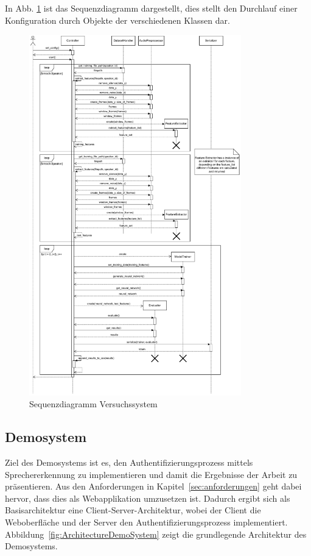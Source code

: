 In Abb. \ref{fig:sequenzdiagramm-versuchssystem} ist das Sequenzdiagramm dargestellt, dies stellt den Durchlauf einer Konfiguration durch Objekte der verschiedenen Klassen dar.
\begin{figure}[H]
    \centering
    \includegraphics[width=0.82\textwidth, keepaspectratio]{images/versuchssytem_sequenzdiagramm.pdf}
    \caption{Sequenzdiagramm Versuchssystem}
    \label{fig:sequenzdiagramm-versuchssystem}
\end{figure}\noindent


\textauthor{\vJB,}{\vLB}{}

\subsection{Demosystem}
Ziel des Demosystems ist es, den Authentifizierungsprozess mittels Sprechererkennung zu implementieren und damit die Ergebnisse der Arbeit zu präsentieren.
Aus den Anforderungen in Kapitel~\ref{sec:anforderungen} geht dabei hervor, dass dies als Webapplikation umzusetzen ist.
Dadurch ergibt sich als Basisarchitektur eine Client-Server-Architektur, wobei der Client die Weboberfläche und der Server den Authentifizierungsprozess implementiert.
Abbildung~\ref{fig:ArchitectureDemoSystem} zeigt die grundlegende Architektur des Demosystems.

